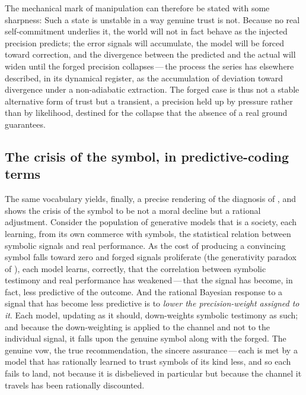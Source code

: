 The mechanical mark of manipulation can therefore be stated with some sharpness:  Such a state is unstable in a way genuine trust is not. Because no real self-commitment underlies it, the world will not in fact behave as the injected precision predicts; the error signals will accumulate, the model will be forced toward correction, and the divergence between the predicted and the actual will widen until the forged precision collapses\,---\,the process the series has elsewhere described, in its dynamical register, as the accumulation of deviation toward divergence under a non-adiabatic extraction. The forged case is thus not a stable alternative form of trust but a transient, a precision held up by pressure rather than by likelihood, destined for the collapse that the absence of a real ground guarantees.

\subsection{The crisis of the symbol, in predictive-coding terms}
\label{p13:sub:mech-crisis}

The same vocabulary yields, finally, a precise rendering of the diagnosis of , and shows the crisis of the symbol to be not a moral decline but a rational adjustment. Consider the population of generative models that is a society, each learning, from its own commerce with symbols, the statistical relation between symbolic signals and real performance. As the cost of producing a convincing symbol falls toward zero and forged signals proliferate (the generativity paradox of ), each model learns, correctly, that the correlation between symbolic testimony and real performance has weakened\,---\,that the signal has become, in fact, less predictive of the outcome. And the rational Bayesian response to a signal that has become less predictive is to \emph{lower the precision-weight assigned to it}. Each model, updating as it should, down-weights symbolic testimony as such; and because the down-weighting is applied to the channel and not to the individual signal, it falls upon the genuine symbol along with the forged. The genuine vow, the true recommendation, the sincere assurance\,---\,each is met by a model that has rationally learned to trust symbols of its kind less, and so each fails to land, not because it is disbelieved in particular but because the channel it travels has been rationally discounted.


